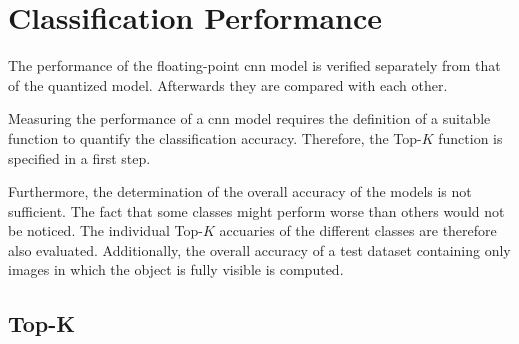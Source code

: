 \section{Classification Performance}
\label{sec:verification_and_benchmark:classification_performance}

The performance of the floating-point \acrshort{cnn} model is verified separately from that of the quantized model.
Afterwards they are compared with each other.

Measuring the performance of a \acrshort{cnn} model requires the definition of a suitable function to quantify the classification accuracy.
Therefore, the Top-$K$ function is specified in a first step.

Furthermore, the determination of the overall accuracy of the models is not sufficient.
The fact that some classes might perform worse than others would not be noticed.
The individual Top-$K$ accuaries of the different classes are therefore also evaluated.
Additionally, the overall accuracy of a test dataset containing only images in which the object is fully visible is computed.

\subsection{Top-K}
\label{subsec:verification_and_benchmark:classification_performance:topk}


